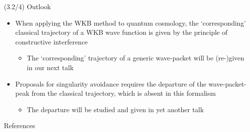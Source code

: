 \documentclass[mathserif]{beamer}
\begin{document}
\begin{frame}{(3.2/4) Outlook}
    \begin{itemize}
        \item
        When applying the WKB method to quantum cosmology, the `corresponding' 
        classical trajectory of a WKB wave function is given by the principle 
        of constructive interference
        \begin{itemize}
            \item 
            The `corresponding' trajectory of a generic wave-packet will be
            (re-)given in our next talk
        \end{itemize}
        \item
        Proposals for singularity avoidance requires the departure of the
        wave-packet-peak from the classical 
        trajectory, which is absent in this 
        formalism
        \begin{itemize}
            \item 
            The departure will be studied and given in yet another talk 
        \end{itemize}
    \end{itemize}
\end{frame}


\appendix

\begin{frame}[allowframebreaks]{References}

\printbibliography

\end{frame}





\end{document}
